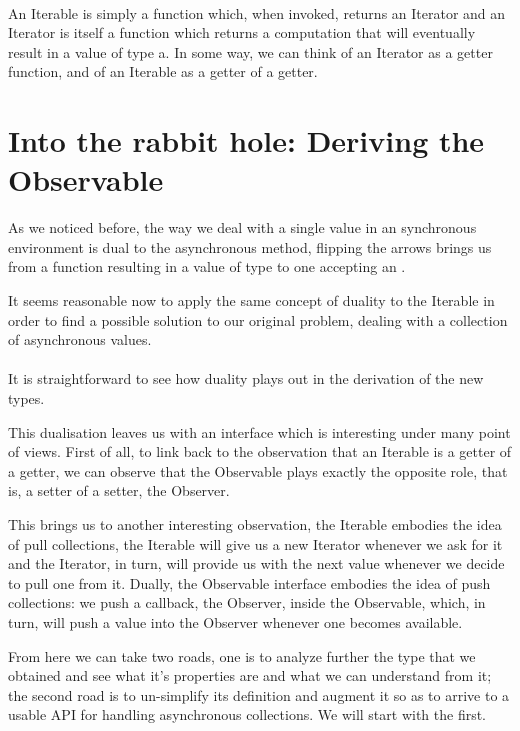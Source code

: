\\

An Iterable is simply a function which, when invoked, returns an Iterator and an Iterator is itself a function which returns a computation that will eventually result in a value of type a. In some way, we can think of an Iterator as a getter function, and of an Iterable as a getter of a getter.

\section{Into the rabbit hole: Deriving the Observable}
\label{sec:sec02}

As we noticed before, the way we deal with a single value in an synchronous environment is dual to the asynchronous method, flipping the arrows brings us from a function resulting in a value of type  to one accepting an . 

It seems reasonable now to apply the same concept of duality to the Iterable in order to find a possible solution to our original problem, dealing with a collection of asynchronous values.\\

\\

It is straightforward to see how duality plays out in the derivation of the new types.

This dualisation leaves us with an interface which is interesting under many point of views. First of all, to link back to the observation that an Iterable is a getter of a getter, we can observe that the Observable plays exactly the opposite role, that is, a setter of a setter, the Observer. 

This brings us to another interesting observation, the Iterable embodies the idea of pull collections, the Iterable will give us a new Iterator whenever we ask for it and the Iterator, in turn, will provide us with the next value whenever we decide to pull one from it. Dually, the Observable interface embodies the idea of push collections: we push a callback, the Observer, inside the Observable, which, in turn, will push a value into the Observer whenever one becomes available. 

From here we can take two roads, one is to analyze further the type that we obtained and see what it's properties are and what we can understand from it; the second road is to un-simplify its definition and augment it so as to arrive to a usable API for handling asynchronous collections. We will start with the first.

